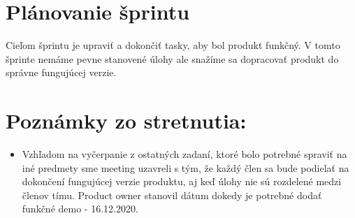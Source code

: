 \documentclass{article}
\begin{document}
    \section*{Plánovanie šprintu}

    \textnormal {Cieľom šprintu je upraviť a dokončiť tasky, aby bol produkt funkčný. 
    V tomto šprinte nemáme pevne stanovené úlohy ale snažíme sa dopracovať produkt do správne fungujúcej verzie.}

    \section*{Poznámky zo stretnutia:}

    \begin{itemize}
        \item Vzhľadom na vyčerpanie z ostatných zadaní, ktoré bolo potrebné spraviť na iné predmety sme meeting uzavreli s tým, že každý člen sa bude podielať na dokončení fungujúcej verzie produktu, aj keď úlohy nie sú rozdelené medzi členov tímu. 
        Product owner stanovil dátum dokedy je potrebné dodať funkčné demo - 16.12.2020. 
    \end{itemize}    
\end{document}
